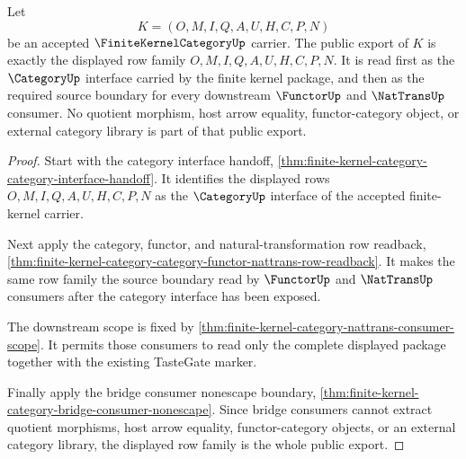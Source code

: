 \begin{theorem}
\label{thm:finite-kernel-category-public-export-interface}
Let
$$
K=(O,M,I,Q,A,U,H,C,P,N)
$$
be an accepted $\FiniteKernelCategoryUp$ carrier. The public export of $K$ is
exactly the displayed row family $O,M,I,Q,A,U,H,C,P,N$. It is read first as the
$\CategoryUp$ interface carried by the finite kernel package, and then as the
required source boundary for every downstream $\FunctorUp$ and $\NatTransUp$
consumer. No quotient morphism, host arrow equality, functor-category object,
or external category library is part of that public export.
\end{theorem}
\begin{proof}
Start with the category interface handoff,
\autoref{thm:finite-kernel-category-category-interface-handoff}. It identifies
the displayed rows $O,M,I,Q,A,U,H,C,P,N$ as the $\CategoryUp$ interface of the
accepted finite-kernel carrier.

Next apply the category, functor, and natural-transformation row readback,
\autoref{thm:finite-kernel-category-category-functor-nattrans-row-readback}.
It makes the same row family the source boundary read by $\FunctorUp$ and
$\NatTransUp$ consumers after the category interface has been exposed.

The downstream scope is fixed by
\autoref{thm:finite-kernel-category-nattrans-consumer-scope}. It permits those
consumers to read only the complete displayed package together with the
existing TasteGate marker.

Finally apply the bridge consumer nonescape boundary,
\autoref{thm:finite-kernel-category-bridge-consumer-nonescape}. Since bridge
consumers cannot extract quotient morphisms, host arrow equality,
functor-category objects, or an external category library, the displayed row
family is the whole public export.
\end{proof}

